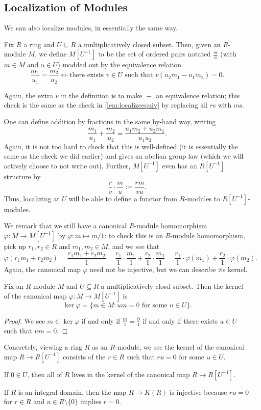 \subsection{Localization of Modules}
We can also localize modules, in essentially the same way.
\begin{definition}
	Fix $R$ a ring and $U\subseteq R$ a multiplicatively closed subset. Then, given an $R$-module $M$, we define $M\left[U^{-1}\right]$ to be the set of ordered pairs notated $\frac mu$ (with $m\in M$ and $u\in U$) modded out by the equivalence relation
	\[\frac{m_1}{u_1}=\frac{m_2}{u_2}\iff\text{there exists }v\in U\text{ such that }v(u_2m_1-u_1m_2)=0.\]
\end{definition}
Again, the extra $v$ in the definition is to make $\equiv$ an equivalence relation; this check is the same as the check in \autoref{lem:localizeequiv} by replacing all $r$s with $m$s.

One can define addition by fractions in the same by-hand way, writing
\[\frac{m_1}{u_1}+\frac{m_2}{u_2}=\frac{u_1m_2+u_2m_1}{u_1u_2}.\]
Again, it is not too hard to check that this is well-defined (it is essentially the same as the check we did earlier) and gives an abelian group law (which we will actively choose to not write out). Further, $M\left[U^{-1}\right]$ even has an $R\left[U^{-1}\right]$ structure by
\[\frac rv\cdot\frac mu:=\frac{rm}{vu}.\]
Thus, localizing at $U$ will be able to define a functor from $R$-modules to $R\left[U^{-1}\right]$-modules.

We remark that we still have a canonical $R$-module homomorphism $\varphi:M\to M\left[U^{-1}\right]$ by $\varphi:m\mapsto m/1$: to check this is an $R$-module homomorphism, pick up $r_1,r_2\in R$ and $m_1,m_2\in M$, and we see that
\[\varphi(r_1m_1+r_2m_2)=\frac{r_1m_1+r_2m_2}1=\frac{r_1}1\cdot\frac{m_1}1+\frac{r_2}1\cdot\frac{m_1}1=\frac{r_1}1\cdot\varphi(m_1)+\frac{r_2}1\cdot\varphi(m_2).\]
Again, the canonical map $\varphi$ need not be injective, but we can describe its kernel.
\begin{lemma}
	Fix an $R$-module $M$ and $U\subseteq R$ a multiplicatively closd subset. Then the kernel of the canonical map $\varphi:M\to M\left[U^{-1}\right]$ is
	\[\ker\varphi=\{m\in M:um=0\text{ for some }u\in U\}.\]
\end{lemma}
\begin{proof}
	We see $m\in\ker\varphi$ if and only if $\frac m1=\frac01$ if and only if there exists $u\in U$ such that $um=0$.
\end{proof}
Concretely, viewing a ring $R$ as an $R$-module, we see the kernel of the canonical map $R\to R\left[U^{-1}\right]$ consists of the $r\in R$ such that $ru=0$ for some $u\in U$.
\begin{example}
	If $0\in U$, then all of $R$ lives in the kernel of the canonical map $R\to R\left[U^{-1}\right]$.
\end{example}
\begin{example}
	If $R$ is an integral domain, then the map $R\to K(R)$ is injective because $ru=0$ for $r\in R$ and $u\in R\setminus\{0\}$ implies $r=0$.
\end{example}

